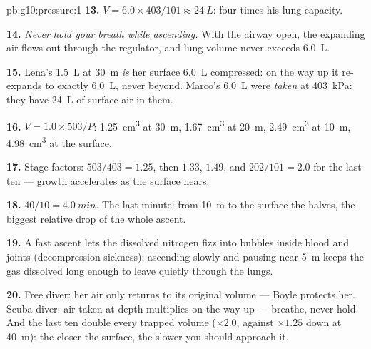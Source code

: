\begin{solution}{pb:g10:pressure:1}
\textbf{13.} $V = 6.0 \times 403/101 \approx \qty{24}{L}$: four times
his lung capacity.

\textbf{14.} \emph{Never hold your breath while ascending.} With the
airway open, the expanding air flows out through the regulator, and
lung volume never exceeds \qty{6.0}{L}.

\textbf{15.} Lena's \qty{1.5}{L} at \qty{30}{m} \emph{is} her surface
\qty{6.0}{L} compressed: on the way up it re-expands to exactly
\qty{6.0}{L}, never beyond. Marco's \qty{6.0}{L} were \emph{taken} at
\qty{403}{kPa}: they have \qty{24}{L} of surface air in them.

\textbf{16.} $V = 1.0 \times 503/P$: \qty{1.25}{cm^3} at \qty{30}{m},
\qty{1.67}{cm^3} at \qty{20}{m}, \qty{2.49}{cm^3} at \qty{10}{m},
\qty{4.98}{cm^3} at the surface.

\textbf{17.} Stage factors: $503/403 = 1.25$, then $1.33$, $1.49$,
and $202/101 = 2.0$ for the last ten  --- growth accelerates as
the surface nears.

\textbf{18.} $40/10 = \qty{4.0}{min}$. The last minute: from
\qty{10}{m} to the surface the  halves, the biggest
relative drop of the whole ascent.

\textbf{19.} A fast ascent lets the dissolved nitrogen fizz into
bubbles inside blood and joints (decompression sickness); ascending
slowly and pausing near \qty{5}{m} keeps the gas dissolved long enough
to leave quietly through the lungs.

\textbf{20.} Free diver: her air only returns to its original volume
--- Boyle protects her. Scuba diver: air taken at depth multiplies on
the way up --- breathe, never hold. And the last ten  double
every trapped volume ($\times 2.0$, against $\times 1.25$ down at
\qty{40}{m}): the closer the surface, the slower you should approach
it.
\end{solution}
